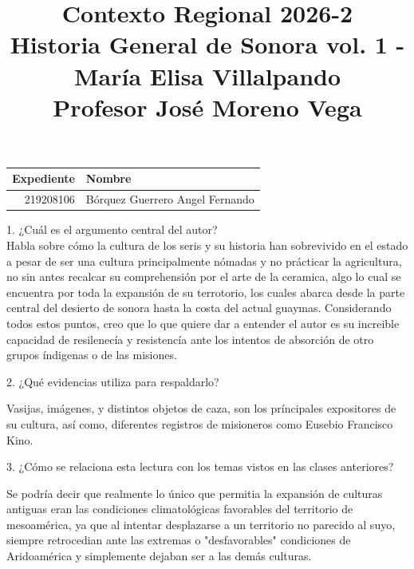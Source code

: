 \documentclass[a4paper, 11pt]{article}
\title
{
    Contexto Regional 2026-2 \\
    Historia General de Sonora vol. 1 - María Elisa Villalpando \\

    Profesor José Moreno Vega
}
\begin{document}
\maketitle

\begin{center}
    \begin{tabular}{r|l}
        \textbf{Expediente} & \textbf{Nombre} \\ \hline
        219208106 & Bórquez Guerrero Angel Fernando \\
    \end{tabular}
\end{center}

{\Large 1. ¿Cuál es el argumento central del autor?} \\
Habla sobre cómo la cultura de los seris y su historia han sobrevivido en el estado a pesar de ser una cultura principalmente nómadas y no prácticar la agricultura, no sin antes recalcar su comprehensión por el arte de la ceramica, algo lo cual se encuentra por toda la expansión de su terrotorio, los cuales abarca desde la parte central del desierto de sonora hasta la costa del actual guaymas. Considerando todos estos puntos, creo que lo que quiere dar a entender el autor es su increible capacidad de resilenecía y resistencía ante los intentos de absorción de otro grupos índigenas o de las misiones.

{\Large 2. ¿Qué evidencias utiliza para respaldarlo?} \par
Vasijas, imágenes, y distintos objetos de caza, son los príncipales expositores de su cultura, así como, diferentes registros de misioneros como Eusebio Francisco Kino.

{\Large 3. ¿Cómo se relaciona  esta lectura con los temas vistos en las clases anteriores?} \par
Se podría decir que realmente lo único que permitia la expansión de culturas antiguas eran las condiciones climatológicas favorables del territorio de mesoamérica, ya que al intentar desplazarse a un territorio no parecido al suyo, siempre retrocedian ante las extremas o "desfavorables" condiciones de Aridoamérica y simplemente dejaban ser a las demás culturas.
\end{document}

